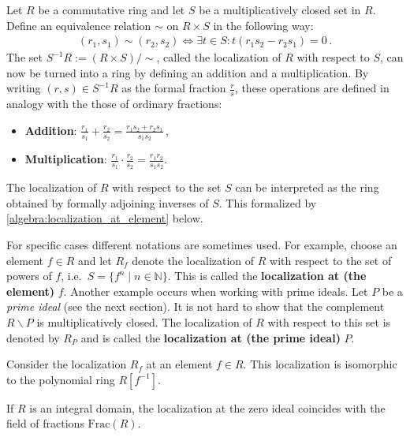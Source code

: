     \begin{construct}[Localization]
        Let $R$ be a commutative ring and let $S$ be a multiplicatively closed set in $R$. Define an equivalence relation $\sim$ on $R\times S$ in the following way:
        \begin{gather}
            (r_1,s_1)\sim(r_2,s_2) \iff \exists t\in S:t(r_1s_2 - r_2s_1) = 0\,.
        \end{gather}
        The set $S^{-1}R:=(R\times S)/\sim$, called the localization of $R$ with respect to $S$, can now be turned into a ring by defining an addition and a multiplication. By writing $(r,s)\in S^{-1}R$ as the formal fraction $\frac{r}{s}$, these operations are defined in analogy with the those of ordinary fractions:
        \begin{itemize}
            \item\textbf{Addition}: $\displaystyle\frac{r_1}{s_1} + \frac{r_2}{s_2} = \frac{r_1s_2 + r_2s_1}{s_1s_2}$\,,
            \item\textbf{Multiplication}: $\displaystyle\frac{r_1}{s_1}\cdot\frac{r_2}{s_2} = \frac{r_1r_2}{s_1s_2}$.
        \end{itemize}
    \end{construct}
    \begin{remark}
        The localization of $R$ with respect to the set $S$ can be interpreted as the ring obtained by formally adjoining inverses of $S$. This formalized by \cref{algebra:localization_at_element} below.
    \end{remark}

    \begin{notation}\label{algebra:localization_notation}
        For specific cases different notations are sometimes used. For example, choose an element $f\in R$ and let $R_f$ denote the localization of $R$ with respect to the set of powers of $f$, i.e.~$S=\{f^n\mid n\in\mathbb{N}\}$. This is called the \textbf{localization at (the element)} $f$. Another example occurs when working with prime ideals. Let $P$ be a \textit{prime ideal} (see the next section). It is not hard to show that the complement $R\backslash P$ is multiplicatively closed. The localization of $R$ with respect to this set is denoted by $R_P$ and is called the \textbf{localization at (the prime ideal)} $P$.
    \end{notation}

    \begin{property}\label{algebra:localization_at_element}
        Consider the localization $R_f$ at an element $f\in R$. This localization is isomorphic to the polynomial ring $R[f^{-1}]$.
    \end{property}
    \begin{property}
        If $R$ is an integral domain, the localization at the zero ideal coincides with the field of fractions $\mathrm{Frac}(R)$.
    \end{property}

